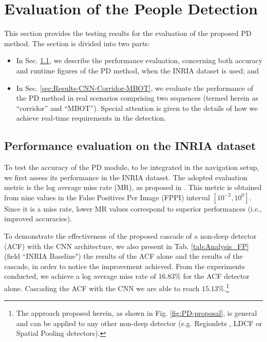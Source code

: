 \documentclass[5p,time]{elsarticle}
\begin{document}
\section{Evaluation of the People Detection}\label{sec:Experimental-results}
This section provides the testing results for the evaluation of the proposed PD method. The section is divided into two parts:
\begin{itemize}
	\item{In Sec. \ref{sec:Results-CNN-INRIA}, we describe the performance evaluation, concerning both accuracy and runtime figures of the PD method, when the INRIA dataset is used; and} 
	\item{In Sec. \ref{sec:Results-CNN-Corridor-MBOT}, we evaluate the performance of the PD method in real scenarios comprising two sequences (termed herein as ``corridor'' and ``MBOT''). Special attention is given to the details of how we achieve real-time requirements in the detection.} 
\end{itemize}


\subsection{Performance evaluation on the INRIA dataset}\label{sec:Results-CNN-INRIA}

To test the accuracy of the PD module, to be integrated in the navigation setup, we first assess its performance in the INRIA dataset. The adopted evaluation metric is the log average miss rate (MR), as proposed in \cite{DollarPAMI2012}. This metric is obtained from nine values in the False Positives Per Image (FPPI) interval $[10^{-2},10^0]$. Since it is a miss rate, lower MR values correspond to superior performances (i.e., improved accuracies).

To demonstrate the effectiveness of the proposed cascade of a non-deep detector (ACF) with the CNN architecture, we
also present in Tab. \ref{tab:Analysis_FP} (field ``INRIA Baseline") the results of the ACF alone and the results of the cascade, in order to notice the improvement achieved.
From the experiments conducted, we achieve a log average miss rate of $16.83\%$ for the ACF detector alone. Cascading the ACF with the CNN we are able to reach $15.13\%$.\footnote{The approach proposed herein, as shown in Fig. \ref{fig:PD-proposal}, is general and can be applied to any other non-deep detector (e.g. Regionlets \cite{Wang2013}, LDCF \cite{NamNIPS2014} or Spatial Pooling \cite{Paisitkriangkrai2014} detectors).}
\end{document}
